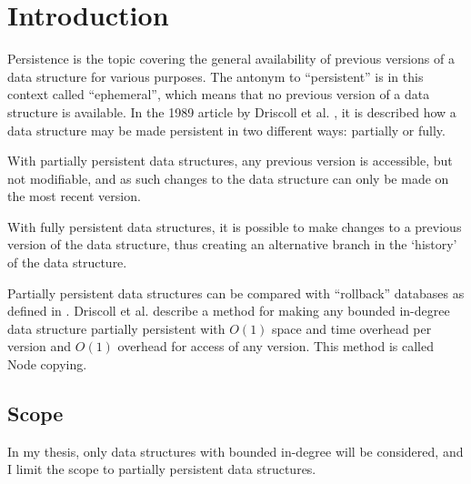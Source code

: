 \chapter{Introduction}
Persistence is the topic covering the general availability of previous versions
of a data structure for various purposes. The antonym to ``persistent'' is in
this context called ``ephemeral'', which means that no previous version of a
data structure is available. In the 1989 article by Driscoll et al.
\cite{Driscoll198986}, it is described how a data structure may be made
persistent in two different ways: partially or fully.

With partially persistent data structures, any previous version is accessible,
but not modifiable, and as such changes to the data structure can only be made
on the most recent version.

With fully persistent data structures, it is possible to make changes to a
previous version of the data structure, thus creating an alternative branch in
the `history' of the data structure.

Partially persistent data structures can be compared with ``rollback'' databases
as defined in \cite{10.1109/AFIPS.1987.11}. Driscoll et al. describe a method
for making any bounded in-degree data structure partially persistent with $O(1)$
space and time overhead per version and $O(1)$ overhead for access of any
version. This method is called Node copying.

\section{Scope}

In my thesis, only data structures with bounded in-degree will be considered,
and I limit the scope to partially persistent data structures.
